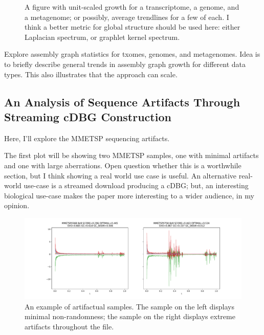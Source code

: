 \documentclass[preprint,number,12pt]{elsarticle}
\begin{document}
\begin{figure}
	\centering
	\caption{\label{fig:exemplars}A figure with unit-scaled growth for a transcriptome, a genome, and a metagenome; or possibly, average trendlines for a few of each. I think a better metric for global structure should be used here: either Laplacian spectrum, or graphlet kernel spectrum.}
\end{figure}

Explore assembly graph statistics for txomes, genomes, and metagenomes. Idea is to briefly describe general trends in assembly graph growth for different data types. This also illustrates that the approach can scale.


\subsection{An Analysis of Sequence Artifacts Through Streaming cDBG Construction}\label{sec:artifacts}

Here, I'll explore the MMETSP sequencing artifacts.

The first plot will be showing two MMETSP samples, one with minimal artifacts and one with large aberrations. Open question whether this is a worthwhile section, but I think showing a real world use case is useful. An alternative real-world use-case is a streamed download producing a cDBG; but, an interesting biological use-case makes the paper more interesting to a wider audience, in my opinion.

\begin{figure}
\centering
\includegraphics[width=\textwidth]{figures/mmetsp_artifacts}
\caption{\label{fig:artifacts}An example of artifactual samples. The sample on the left displays minimal non-randomness; the sample on the right displays extreme artifacts throughout the file.}
\end{figure}
\end{document}
